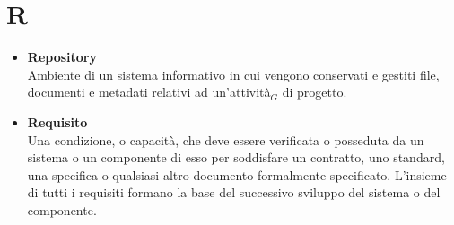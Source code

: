 \chapter{R} \label{R}
	\begin{itemize}
		\item \textbf{Repository} \\
		Ambiente di un sistema informativo in cui vengono conservati e gestiti file, documenti e metadati relativi ad un’attività$_G$ di progetto.
		
		\item \textbf{Requisito}\\
		Una condizione, o capacità, che deve essere verificata o posseduta da un sistema o un componente di esso per soddisfare un contratto, uno standard, una specifica o qualsiasi altro documento formalmente specificato. L'insieme di tutti i requisiti formano la base del successivo sviluppo del sistema o del componente.
		
	\end{itemize}